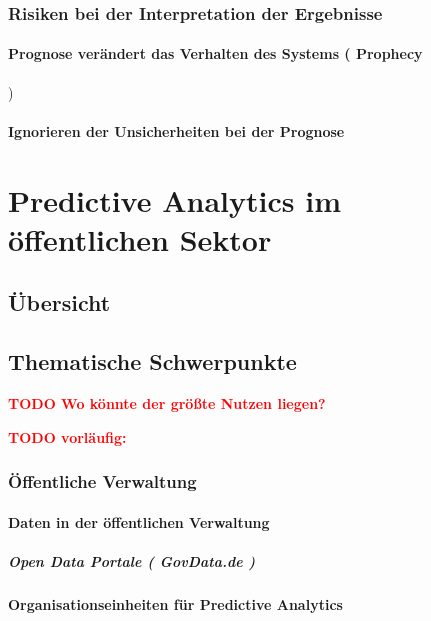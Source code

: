 \documentclass[12pt,a4paper,listof=totoc,oneside]{scrreprt}
\newcommand{\todo}[1]{\textcolor{red}{\textbf{TODO #1}}}
\begin{document}
\subsection{Risiken bei der Interpretation der Ergebnisse}

\subsubsection{Prognose verändert das Verhalten des Systems 
  ( Prophecy\grqq})

\subsubsection{Ignorieren der Unsicherheiten bei der Prognose}

\chapter{Predictive Analytics im öffentlichen Sektor}

\section{Übersicht}

\section{Thematische Schwerpunkte}
\todo{Wo könnte der größte Nutzen liegen?}

\todo{vorläufig:}

\subsection{Öffentliche Verwaltung}

\subsubsection{Daten in der öffentlichen Verwaltung}

\paragraph{Open Data Portale ( GovData.de )}

\subsubsection{Organisationseinheiten für Predictive Analytics}
\end{document}
